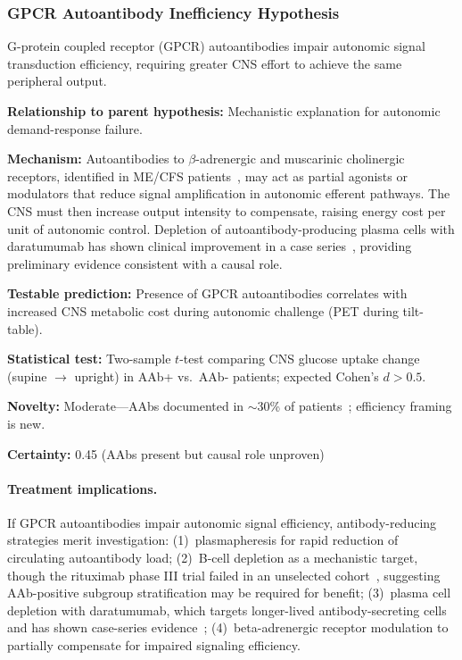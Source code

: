 \subsubsection{GPCR Autoantibody Inefficiency Hypothesis}

\begin{hypothesis}
\label{hyp:gpcr-inefficiency}
G-protein coupled receptor (GPCR) autoantibodies impair autonomic signal transduction efficiency, requiring greater CNS effort to achieve the same peripheral output.

\textbf{Relationship to parent hypothesis:} Mechanistic explanation for autonomic demand-response failure.

\textbf{Mechanism:} Autoantibodies to $\beta$-adrenergic and muscarinic cholinergic receptors, identified in ME/CFS patients~\cite{Loebel2016}, may act as partial agonists or modulators that reduce signal amplification in autonomic efferent pathways. The CNS must then increase output intensity to compensate, raising energy cost per unit of autonomic control. Depletion of autoantibody-producing plasma cells with daratumumab has shown clinical improvement in a case series~\cite{scheibenbogen2024daratumumab}, providing preliminary evidence consistent with a causal role.

\textbf{Testable prediction:} Presence of GPCR autoantibodies correlates with increased CNS metabolic cost during autonomic challenge (PET during tilt-table).

\textbf{Statistical test:} Two-sample $t$-test comparing CNS glucose uptake change (supine $\to$ upright) in AAb+ vs.\ AAb- patients; expected Cohen's $d > 0.5$.

\textbf{Novelty:} Moderate---AAbs documented in $\sim$30\% of patients~\cite{Loebel2016}; efficiency framing is new.

\textbf{Certainty:} 0.45 (AAbs present but causal role unproven)

\paragraph{Treatment implications.}
If GPCR autoantibodies impair autonomic signal efficiency, antibody-reducing strategies merit investigation: (1)~plasmapheresis for rapid reduction of circulating autoantibody load; (2)~B-cell depletion as a mechanistic target, though the rituximab phase III trial failed in an unselected cohort~\cite{Fluge2015rituximab_rct}, suggesting AAb-positive subgroup stratification may be required for benefit; (3)~plasma cell depletion with daratumumab, which targets longer-lived antibody-secreting cells and has shown case-series evidence~\cite{scheibenbogen2024daratumumab}; (4)~beta-adrenergic receptor modulation to partially compensate for impaired signaling efficiency.


\end{hypothesis}
